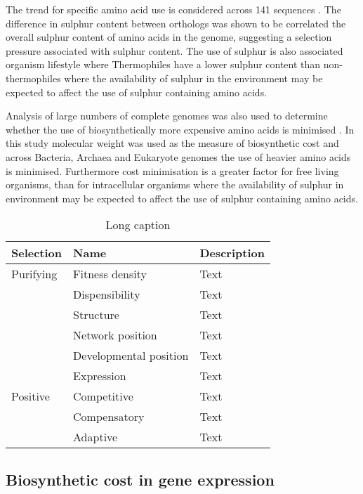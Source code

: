 The trend for specific amino acid use is considered across 141 sequences \cite{bragg2006}. The difference in sulphur content between orthologs was shown to be correlated the overall sulphur content of amino acids in the genome, suggesting a selection pressure associated with sulphur content. The use of sulphur is also associated organism lifestyle where Thermophiles have a lower sulphur content than non-thermophiles where the availability of sulphur in the environment may be expected to affect the use of sulphur containing amino acids.

Analysis of large numbers of complete genomes was also used to determine whether the use of biosynthetically more expensive amino acids is minimised \cite{seligmann2003}. In this study molecular weight was used as the measure of biosynthetic cost and across Bacteria, Archaea and Eukaryote genomes the use of heavier amino acids is minimised. Furthermore cost minimisation is a greater factor for free living organisms, than for intracellular organisms where the availability of sulphur in environment may be expected to affect the use of sulphur containing amino acids.

\begin{table}
  \centering
  \begin{tabular}{ l l l }
  \toprule
  Selection & Name                   & Description \\ \midrule
  Purifying & Fitness density        & Text \\
            & Dispensibility         & Text \\
            & Structure              & Text \\
            & Network position       & Text \\
            & Developmental position & Text \\
            & Expression             & Text \\
  Positive  & Competitive            & Text \\
            & Compensatory           & Text \\
            & Adaptive               & Text \\ \bottomrule
  \end{tabular}
  \caption[Factors in protein evolution]{Long caption}
  \label{table:protein_selective_pressures}
\end{table}

\subsection{Biosynthetic cost in gene expression}

